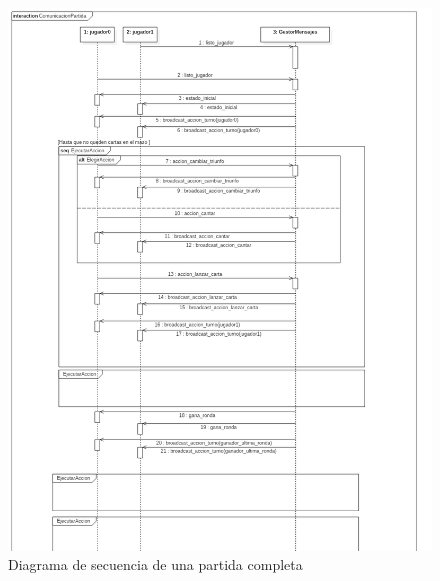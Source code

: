 \begin{figure}[H]
\includegraphics[width=\linewidth]{figuras/diagramasSecuencia/partidaCompleta1.png}
\caption{Diagrama de secuencia de una partida completa}
\label{fig:partidaCompleta1}
\end{figure}

